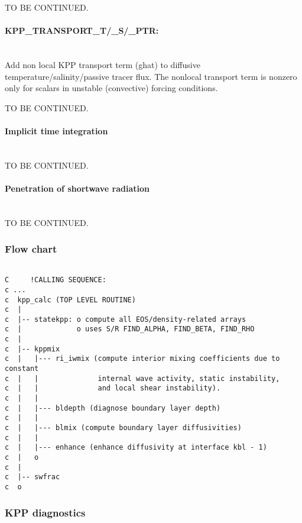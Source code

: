 TO BE CONTINUED.

\paragraph{KPP\_TRANSPORT\_T/\_S/\_PTR:} ~ \\
%
Add non local KPP transport term (ghat) to diffusive
temperature/salinity/passive tracer flux.
The nonlocal transport term is nonzero only for scalars
in unstable (convective) forcing conditions. 

TO BE CONTINUED.

\paragraph{Implicit time integration} ~ \\
%
TO BE CONTINUED.


\paragraph{Penetration of shortwave radiation} ~ \\
%
TO BE CONTINUED.



\subsubsection{Flow chart
\label{sec:pkg:kpp:flowchart}}


{\footnotesize
\begin{verbatim}

C     !CALLING SEQUENCE:
c ...
c  kpp_calc (TOP LEVEL ROUTINE)
c  |
c  |-- statekpp: o compute all EOS/density-related arrays
c  |             o uses S/R FIND_ALPHA, FIND_BETA, FIND_RHO
c  |
c  |-- kppmix
c  |   |--- ri_iwmix (compute interior mixing coefficients due to constant
c  |   |              internal wave activity, static instability, 
c  |   |              and local shear instability).
c  |   |
c  |   |--- bldepth (diagnose boundary layer depth)
c  |   |
c  |   |--- blmix (compute boundary layer diffusivities)
c  |   |
c  |   |--- enhance (enhance diffusivity at interface kbl - 1)
c  |   o
c  |
c  |-- swfrac
c  o

\end{verbatim}
}


\subsubsection{KPP diagnostics
\label{sec:pkg:kpp:diagnostics}}

